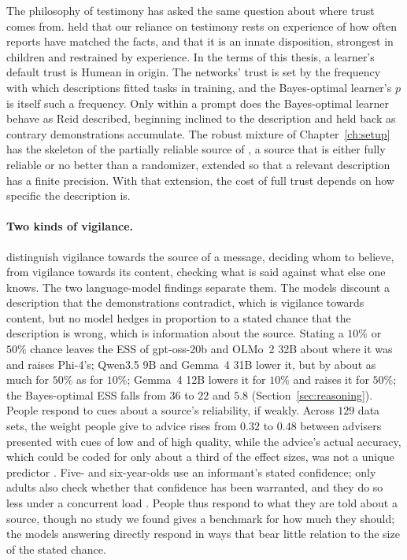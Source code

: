 The philosophy of testimony has asked the same question about where trust comes from. \citet{hume1748} held that our reliance on testimony rests on experience of how often reports have matched the facts, and \citet{reid1764} that it is an innate disposition, strongest in children and restrained by experience. In the terms of this thesis, a learner's default trust is Humean in origin. The networks' trust is set by the frequency with which descriptions fitted tasks in training, and the Bayes-optimal learner's $p$ is itself such a frequency. Only within a prompt does the Bayes-optimal learner behave as Reid described, beginning inclined to the description and held back as contrary demonstrations accumulate. The robust mixture of Chapter~\ref{ch:setup} has the skeleton of the partially reliable source of \citet{bovens2002}, a source that is either fully reliable or no better than a randomizer, extended so that a relevant description has a finite precision. With that extension, the cost of full trust depends on how specific the description is.

\paragraph{Two kinds of vigilance.} \citet{sperber2010} distinguish vigilance towards the source of a message, deciding whom to believe, from vigilance towards its content, checking what is said against what else one knows. The two language-model findings separate them. The models discount a description that the demonstrations contradict, which is vigilance towards content, but no model hedges in proportion to a stated chance that the description is wrong, which is information about the source. Stating a $10\%$ or $50\%$ chance leaves the ESS of gpt-oss-20b and OLMo~2 32B about where it was and raises Phi-4's; Qwen3.5 9B and Gemma~4 31B lower it, but by about as much for $50\%$ as for $10\%$; Gemma~4 12B lowers it for $10\%$ and raises it for $50\%$; the Bayes-optimal ESS falls from $36$ to $22$ and $5.8$ (Section~\ref{sec:reasoning}). People respond to cues about a source's reliability, if weakly. Across $129$ data sets, the weight people give to advice rises from $0.32$ to $0.48$ between advisers presented with cues of low and of high quality, while the advice's actual accuracy, which could be coded for only about a third of the effect sizes, was not a unique predictor \citep{bailey2023}. Five- and six-year-olds use an informant's stated confidence; only adults also check whether that confidence has been warranted, and they do so less under a concurrent load \citep{tenney2011}. People thus respond to what they are told about a source, though no study we found gives a benchmark for how much they should; the models answering directly respond in ways that bear little relation to the size of the stated chance.

